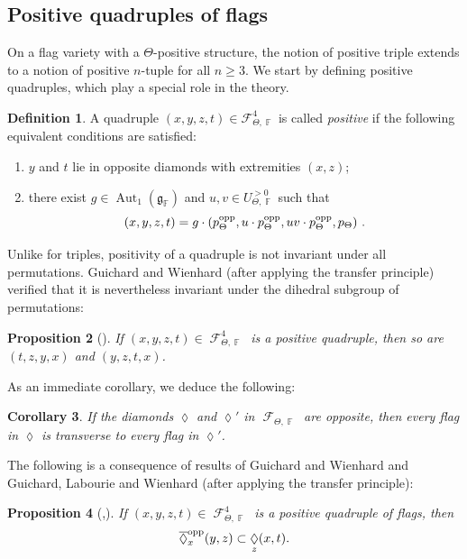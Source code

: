\documentclass{amsart}
\theoremstyle{plain}
\newtheorem{proposition}{Proposition}[section]
\newtheorem{corollary}[proposition]{Corollary}
\theoremstyle{definition}
\newtheorem{definition}[proposition]{Definition}
\DeclareMathOperator{\Aut}{Aut}
\DeclareMathOperator{\Diam}{\lozenge}
\DeclareMathOperator{\Fc}{\mathcal{F}}
\DeclareMathOperator{\Fb}{{\mathbb{F}}}
\newcommand{\opp}{\textnormal{opp}}
\newcommand{\1}{\mathbf{1}}
\begin{document}
\subsection{Positive quadruples of flags}

On a flag variety with a $\Theta$-positive structure, the notion of positive triple extends to a notion of positive $n$-tuple for all $n\geq 3$. We start by defining positive quadruples, which play a special role in the theory.

\begin{definition}
A quadruple $(x,y,z,t)\in \mathcal F_{\Theta,\Fb}^4$ is called \emph{positive} if the following equivalent conditions are satisfied:
\begin{enumerate}
    \item $y$ and $t$ lie in opposite diamonds with extremities $(x,z)$;
    \item there exist $g\in \Aut_1(\mathfrak g_{\Fb})$ and $u,v\in U_{\Theta,\Fb}^{>0}$  such that
    \[(x,y,z,t) = g\cdot (p_\Theta^\opp, u \cdot p_\Theta^\opp, u v\cdot p_\Theta^\opp, p_\Theta)~.\]
\end{enumerate}
\end{definition}

Unlike for triples, positivity of a quadruple is not invariant under all permutations. Guichard and Wienhard \cite{guichard2025generalizing} (after applying the transfer principle) verified that it is nevertheless invariant under the dihedral subgroup of permutations:

\begin{proposition}[{\cite[Proposition 13.19]{guichard2025generalizing}}]
    If $(x,y,z,t)\in\Fc_{\Theta,\Fb}^4$ is a positive quadruple, then so are $(t,z,y,x)$ and $(y,z,t,x)$.
\end{proposition}

As an immediate corollary, we deduce the following:

\begin{corollary}\label{opposites transverse}
If the diamonds $\Diam$ and $\Diam'$ in $\Fc_{\Theta,\Fb}$ are opposite, then every flag in $\Diam$ is transverse to every flag in $\Diam'$. 
\end{corollary}

The following is a consequence of results of Guichard and Wienhard \cite{guichard2025generalizing} and Guichard, Labourie and Wienhard \cite{GLW} (after applying the transfer principle):

\begin{proposition}[{\cite[Lemma 13.21]{guichard2025generalizing}},{\cite[Corollary 3.9]{GLW}}]\label{lem: closure of diamond}
If $(x,y,z,t)\in\Fc_{\Theta,\Fb}^4$ is a positive quadruple of flags, then 
\[\overline{\Diam}_x^{\rm opp}(y,z)\subset \Diam_z(x,t).\]
\end{proposition}
\end{document}
